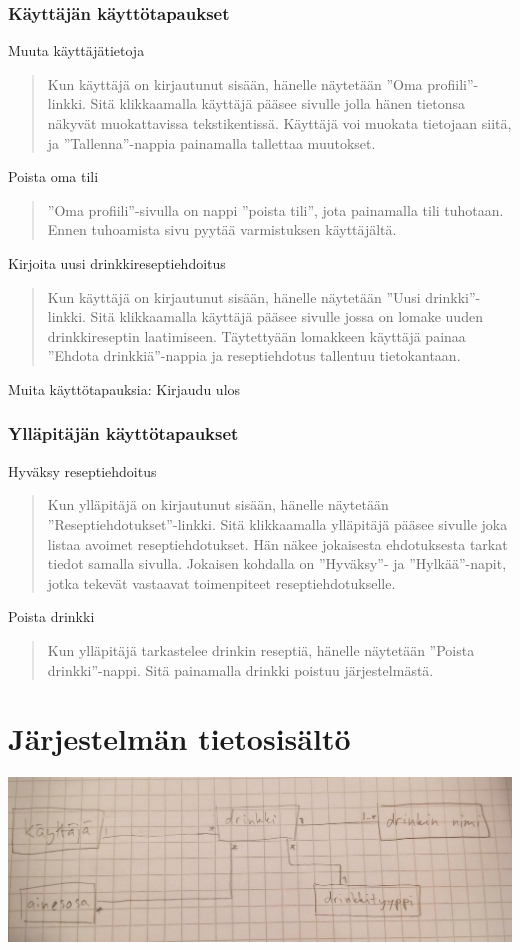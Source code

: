 \documentclass[a4paper]{article}
\begin{document}
\subsubsection{Käyttäjän käyttötapaukset}
Muuta käyttäjätietoja
\begin{quote}
  Kun käyttäjä on kirjautunut sisään, hänelle näytetään ''Oma profiili''-linkki. Sitä klikkaamalla käyttäjä pääsee sivulle jolla hänen tietonsa näkyvät muokattavissa tekstikentissä. Käyttäjä voi muokata tietojaan siitä, ja ''Tallenna''-nappia painamalla tallettaa muutokset.
\end{quote}
Poista oma tili
\begin{quote}
  ''Oma profiili''-sivulla on nappi ''poista tili'', jota painamalla tili tuhotaan. Ennen tuhoamista sivu pyytää varmistuksen käyttäjältä.
\end{quote}
Kirjoita uusi drinkkireseptiehdoitus
\begin{quote}
  Kun käyttäjä on kirjautunut sisään, hänelle näytetään ''Uusi drinkki''-linkki. Sitä klikkaamalla käyttäjä pääsee sivulle jossa on lomake uuden drinkkireseptin laatimiseen. Täytettyään lomakkeen käyttäjä painaa ''Ehdota drinkkiä''-nappia ja reseptiehdotus tallentuu tietokantaan.
\end{quote}
Muita käyttötapauksia: Kirjaudu ulos
\subsubsection{Ylläpitäjän käyttötapaukset}
Hyväksy reseptiehdoitus
\begin{quote}
  Kun ylläpitäjä on kirjautunut sisään, hänelle näytetään ''Reseptiehdotukset''-linkki. Sitä klikkaamalla ylläpitäjä pääsee sivulle joka listaa avoimet reseptiehdotukset. Hän näkee jokaisesta ehdotuksesta tarkat tiedot samalla sivulla. Jokaisen kohdalla on ''Hyväksy''- ja ''Hylkää''-napit, jotka tekevät vastaavat toimenpiteet reseptiehdotukselle.
\end{quote}
Poista drinkki
\begin{quote}
  Kun ylläpitäjä tarkastelee drinkin reseptiä, hänelle näytetään ''Poista drinkki''-nappi. Sitä painamalla drinkki poistuu järjestelmästä.
\end{quote}
\section{Järjestelmän tietosisältö}
\includegraphics[width=\textwidth]{tietosisalto}
\end{document}
